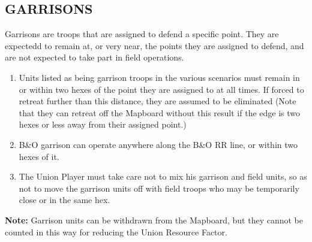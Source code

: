 \subsection{GARRISONS}

Garrisons are troops that are assigned to defend a specific point. They are expectedd to remain at, or very near, the points they are assigned to defend, and are not expected to take part in field operations.

\begin{enumerate}
  \item Units listed as being garrison troops in the various scenarios must remain in or within two hexes of the point they are assigned to at all times. If forced to retreat further than this distance, they are assumed to be eliminated (Note that they can retreat off the Mapboard without this result if the edge is two hexes or less away from their assigned point.)

  \item B\&O garrison can operate anywhere along the B\&O RR line, or within two hexes of it.

  \item The Union Player must take care not to mix his garrison and field units, so as not to move the garrison units off with field troops who may be temporarily close or in the same hex.
\end{enumerate}

\textbf{Note:} Garrison units can be withdrawn from the Mapboard, but they cannot be counted in this way for reducing the Union Resource Factor.